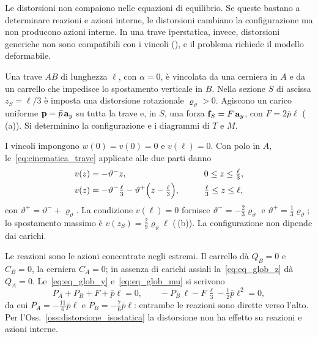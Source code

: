 \begin{oss}\label{oss:distorsione_isostatica}
	Le distorsioni non compaiono nelle equazioni di
	equilibrio. Se queste bastano a determinare reazioni
	e azioni interne, le distorsioni cambiano la
	configurazione ma non producono azioni interne. In una
	trave iperstatica, invece, distorsioni generiche non
	sono compatibili con i vincoli
	(), e il problema richiede
	il modello deformabile.
\end{oss}



\begin{esempio}\label{sec:esempio_completo}
	Una trave $AB$ di lunghezza $\ell$, con $\alpha = 0$,
	è vincolata da una cerniera in $A$ e da un carrello
	che impedisce lo spostamento verticale in $B$. Nella
	sezione $S$ di ascissa $z_S = \ell/3$ è imposta una
	distorsione rotazionale $\varrho_\vartheta > 0$.
	Agiscono un carico uniforme $\mathbf{p} = \bar p\,\mathbf{a}_y$
	su tutta la trave e, in $S$, una forza
	$\mathbf{f}_S = F\,\mathbf{a}_y$, con $F = 2\bar p\ell$
	(\,(a)). Si determinino
	la configurazione e i diagrammi di $T$ e $M$.
	
	\begin{svolgimento}
		
		I vincoli impongono $w(0) = v(0) = 0$ e
		$v(\ell) = 0$. Con polo in $A$,
		le~\eqref{eq:cinematica_trave} applicate alle
		due parti danno
		\begin{alignat*}{2}
			v(z) &= -\vartheta^- z,
			&\qquad& 0 \le z \le \tfrac{\ell}{3},\\
			v(z) &= -\vartheta^-\tfrac{\ell}{3}
			- \vartheta^+\Bigl(z - \tfrac{\ell}{3}\Bigr),
			&& \tfrac{\ell}{3} \le z \le \ell,
		\end{alignat*}
		con $\vartheta^+ = \vartheta^- + \varrho_\vartheta$.
		La condizione $v(\ell) = 0$ fornisce
		$\vartheta^- = -\tfrac{2}{3}\varrho_\vartheta$ e
		$\vartheta^+ = \tfrac{1}{3}\varrho_\vartheta$;
		lo spostamento massimo è
		$v(z_S) = \tfrac{2}{9}\varrho_\vartheta\ell$
		(\,(b)).
		La configurazione non dipende dai carichi.
		
		Le reazioni sono le azioni concentrate negli
		estremi. Il carrello dà $Q_B = 0$ e $C_B = 0$, la
		cerniera $C_A = 0$; in assenza di carichi assiali
		la~\eqref{eq:eq_glob_z} dà $Q_A = 0$.
		Le~\eqref{eq:eq_glob_y} e~\eqref{eq:eq_glob_mu}
		si scrivono
		\begin{equation*}
			P_A + P_B + F + \bar p\ell = 0, \qquad
			-P_B\,\ell - F\,\tfrac{\ell}{3} - \tfrac{1}{2}\bar p\ell^2 = 0,
		\end{equation*}
		da cui $P_A = -\tfrac{11}{6}\bar p\ell$ e
		$P_B = -\tfrac{7}{6}\bar p\ell$: entrambe le
		reazioni sono dirette verso l'alto. Per
		l'Oss.~\ref{oss:distorsione_isostatica} la
		distorsione non ha effetto su reazioni e azioni
		interne.
		

\end{svolgimento}
\end{esempio}
